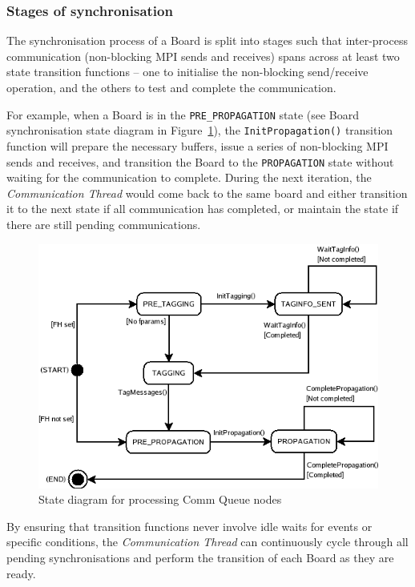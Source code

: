 \subsubsection{Stages of synchronisation}

The synchronisation process of a Board is split into stages such that inter-process communication (non-blocking MPI sends and receives) spans across at least two state transition functions -- one to initialise the non-blocking send/receive operation, and the others to test and complete the communication.

For example, when a Board is in the \texttt{PRE\_PROPAGATION} state (see Board synchronisation state diagram in  Figure~\ref{fig:commstate}), the \texttt{InitPropagation()} transition function will prepare the necessary buffers, issue a series of non-blocking MPI sends and receives, and transition the Board to the \texttt{PROPAGATION} state without waiting for the communication to complete. During the next iteration, the \textit{Communication Thread} would come back to the same board and either transition it to the next state if all communication has completed, or maintain the state if there are still pending communications. 

\begin{figure}[ht]
 \centering
  \includegraphics[scale=0.50]{CommNode.png}
 \caption{State diagram for processing Comm Queue nodes}
 \label{fig:commstate}
\end{figure}

By ensuring that transition functions never involve idle waits for events or specific conditions, the \textit{Communication Thread} can continuously cycle through all pending synchronisations and perform the transition of each Board as they are ready.

